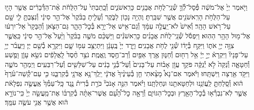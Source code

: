 \documentclass[twoside, openany, parskip=half, 11pt]{book}
\begin{document}
\begin{footnotesize}
\begin{multicols}{2}

\\
\\
וַיֹּ֤אמֶר יְיָ֙ אֶל־מֹשֶׁ֔ה פְּ֯סָל־לְ֯ךָ֛ שְׁ֯נֵֽי־לֻחֹ֥ת אֲבָנִ֖ים כָּרִֽאשֹׁנִ֑ים וְ֯כָֽתַבְתִּי֙ עַל־הַלֻּחֹ֔ת אֶ֨ת־הַדְּ֯בָרִ֔ים אֲשֶׁ֥ר הָי֛וּ עַל־הַלֻּחֹ֥ת הָרִֽאשֹׁנִ֖ים אֲשֶׁ֥ר שִׁבַּֽרְתָּ׃ וֶהְיֵ֥ה נָכ֖וֹן לַבֹּ֑קֶר וְ֯עָלִ֤יתָ בַבֹּ֨קֶר֙ אֶל־הַ֣ר סִינַ֔י וְ֯נִצַּבְתָּ֥ לִ֛י שָׁ֖ם עַל־רֹ֥אשׁ הָהָֽר׃ וְ֯אִישׁ֙ לֹא־יַֽעֲלֶ֣ה עִמָּ֔ךְ וְ֯גַם־אִ֥ישׁ אַל־יֵרָ֖א בְּ֯כׇל־הָהָ֑ר גַּם־הַצֹּ֤אן וְ֯הַבָּקָר֙ אַל־יִרְע֔וּ אֶל־מ֖וּל הָהָ֥ר הַהֽוּא׃ וַיִּפְסֹ֡ל שְׁ֯נֵֽי־לֻחֹ֨ת אֲבָנִ֜ים כָּרִֽאשֹׁנִ֗ים וַיַּשְׁכֵּ֨ם מֹשֶׁ֤ה בַבֹּ֨קֶר֙ וַיַּ֨עַל֙ אֶל־הַ֣ר סִינַ֔י כַּֽאֲשֶׁ֛ר צִוָּ֥ה יְיָ֖ אֹת֑וֹ וַיִּקַּ֣ח בְּ֯יָד֔וֹ שְׁ֯נֵ֖י לֻחֹ֥ת אֲבָנִֽים׃ וַיֵּ֤רֶד יְיָ֙ בֶּֽעָנָ֔ן וַיִּתְיַצֵּ֥ב עִמּ֖וֹ שָׁ֑ם וַיִּקְרָ֥א בְ֯שֵׁ֖ם יְיָ׃ וַיַּֽעֲבֹ֨ר יְיָ֥ עַל־פָּנָיו֘ וַיִּקְרָא֒ יְיָ֣ יְיָ֔ אֵ֥ל רַח֖וּם וְ֯חַנּ֑וּן אֶ֥רֶךְ אַפַּ֖יִם וְ֯רַב־חֶ֥סֶד וֶֽאֱמֶֽת׃ נֹצֵ֥ר חֶ֨סֶד֙ לָֽאֲלָפִ֔ים נֹשֵׂ֥א עָוֹ֛ן וָפֶ֖שַׁע וְ֯חַטָּאָ֑ה וְ֯נַקֵּה֙ לֹ֣א יְ֯נַקֶּ֔ה פֹּקֵ֣ד עֲוֹ֣ן אָב֗וֹת עַל־בָּנִים֙ וְ֯עַל־בְּ֯נֵ֣י בָנִ֔ים עַל־שִׁלֵּשִׁ֖ים וְ֯עַל־רִבֵּעִֽים׃ וַיְמַהֵ֖ר מֹשֶׁ֑ה וַיִּקֹּ֥ד אַ֖רְצָה וַיִּשְׁתָּֽחוּ׃ וַיֹּ֡אמֶר אִם־נָא֩ מָצָ֨אתִי חֵ֤ן בְּ֯עֵינֶ֨יךָ֙ אֲדֹנָ֔י יֵֽלֶךְ־נָ֥א אֲדֹנָ֖י בְּ֯קִרְבֵּ֑נוּ כִּ֤י עַם־קְ֯שֵׁה־עֹ֨רֶף֙ ה֔וּא וְ֯סָֽלַחְתָּ֛ לַֽעֲוֹנֵ֥נוּ וּלְחַטָּאתֵ֖נוּ וּנְחַלְתָּֽנוּ׃ וַיֹּ֗אמֶר הִנֵּ֣ה אָנֹכִי֘ כֹּרֵ֣ת בְּ֯רִית֒ נֶ֤גֶד כָּֽל־עַמְּ֯ךָ֙ אֶֽעֱשֶׂ֣ה נִפְלָאֹ֔ת אֲשֶׁ֛ר לֹֽא־נִבְרְ֯א֥וּ בְ֯כׇל־הָאָ֖רֶץ וּבְכׇל־הַגּוֹיִ֑ם וְ֯רָאָ֣ה כׇל־הָ֠עָ֠ם אֲשֶׁר־אַתָּ֨ה בְ֯קִרְבּ֜וֹ אֶת־מַֽעֲשֵׂ֤ה יְיָ֙ כִּֽי־נוֹרָ֣א ה֔וּא אֲשֶׁ֥ר אֲנִ֖י עֹשֶׂ֥ה עִמָּֽךְ׃

\end{multicols}
\end{footnotesize}
\end{document}
